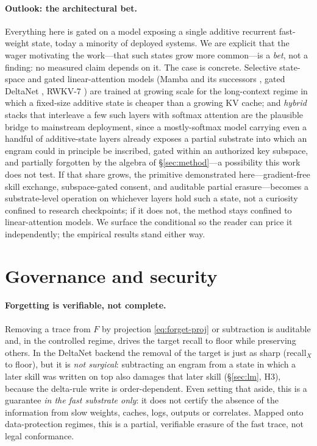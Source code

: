 \documentclass[11pt]{article}
\theoremstyle{definition}
\newcommand{\F}{F}
\begin{document}
\paragraph{Outlook: the architectural bet.}
Everything here is gated on a model exposing a single additive recurrent
fast-weight state, today a minority of deployed systems. We are explicit that the
wager motivating the work---that such states grow more common---is a \emph{bet},
not a finding: no measured claim depends on it. The case is concrete. Selective
state-space and gated linear-attention models (Mamba and its successors
\cite{gu2023mamba}, gated DeltaNet \cite{yang2024gdn}, RWKV-7 \cite{peng2025rwkv7})
are trained at growing scale for the long-context regime in which a fixed-size
additive state is cheaper than a growing KV cache; and \emph{hybrid} stacks that
interleave a few such layers with softmax attention
\cite{lieber2024jamba,de2024griffin} are the plausible bridge to mainstream
deployment, since a mostly-softmax model carrying even a handful of additive-state
layers already exposes a partial substrate into which an engram could in principle be
inscribed, gated within an authorized key subspace, and partially forgotten by the
algebra of \S\ref{sec:method}---a possibility this work does not test. If that share grows, the primitive demonstrated
here---gradient-free skill exchange, subspace-gated consent, and auditable partial
erasure---becomes a substrate-level operation on whichever layers hold such a
state, not a curiosity confined to research checkpoints; if it does not, the
method stays confined to linear-attention models. We surface the conditional so
the reader can price it independently; the empirical results stand either way.

\section{Governance and security}
\label{sec:governance}

\paragraph{Forgetting is verifiable, not complete.}
Removing a trace from $\F$ by projection \eqref{eq:forget-proj} or subtraction is auditable and, in the controlled regime, drives the target recall to floor while preserving others. In the DeltaNet backend the removal of the target is just as sharp (recall$_X$ to floor), but it is \emph{not surgical}: subtracting an engram from a state in which a later skill was written on top also damages that later skill (\S\ref{sec:lm}, H3), because the delta-rule write is order-dependent. Even setting that aside, this is a guarantee \emph{in the fast substrate only}: it does not certify the absence of the information from slow weights, caches, logs, outputs or correlates. Mapped onto data-protection regimes, this is a partial, verifiable erasure of the fast trace, not legal conformance.
\end{document}
